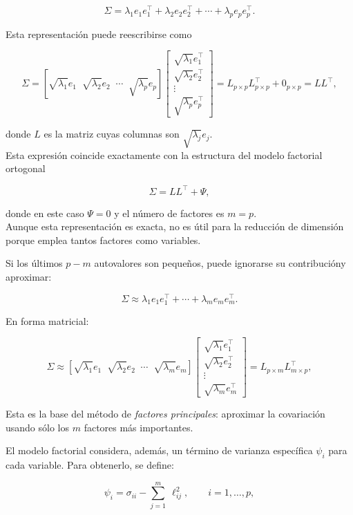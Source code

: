 \documentclass[
]{book}
\begin{document}
\[
\Sigma 
= \lambda_1 e_1 e_1^\top 
+ \lambda_2 e_2 e_2^\top 
+ \cdots 
+ \lambda_p e_p e_p^\top.
\]

Esta representación puede reescribirse como

\[
\Sigma 
= 
\left[
\sqrt{\lambda_1} e_1 \;\; 
\sqrt{\lambda_2} e_2 \;\; 
\cdots \;\; 
\sqrt{\lambda_p} e_p
\right]
\left[
\begin{array}{c}
\sqrt{\lambda_1} e_1^\top \\
\sqrt{\lambda_2} e_2^\top \\
\vdots \\
\sqrt{\lambda_p} e_p^\top
\end{array}
\right]
= L_{p\times p}L_{p\times p}^\top + 0_{p\times p} = LL^\top,
\]

donde \(L\) es la matriz cuyas columnas son \(\sqrt{\lambda_j} e_j\).\\
Esta expresión coincide exactamente con la estructura del modelo factorial ortogonal

\[
\Sigma = LL^{\top} + \Psi,
\]

donde en este caso \(\Psi = 0\) y el número de factores es \(m = p\).\\
Aunque esta representación es exacta, no es útil para la reducción de dimensión porque emplea tantos factores como variables.

Si los últimos \(p-m\) autovalores son pequeños, puede ignorarse su contribucióny aproximar:

\[
\Sigma \approx 
\lambda_1 e_1 e_1^{\top} + \cdots + \lambda_m e_m e_m^{\top}.
\]

En forma matricial:

\[
\Sigma \approx 
\left[
\sqrt{\lambda_1} e_1 \;\; 
\sqrt{\lambda_2} e_2 \;\; 
\cdots \;\;
\sqrt{\lambda_m} e_m
\right]
\left[
\begin{array}{c}
\sqrt{\lambda_1} e_1^{\top} \\
\sqrt{\lambda_2} e_2^{\top} \\
\vdots \\
\sqrt{\lambda_m} e_m^{\top}
\end{array}
\right]
= L_{p\times m}L_{m\times p}^\top,
\]

Esta es la base del método de \textit{factores principales}: aproximar la covariación usando sólo los \(m\) factores más importantes.

El modelo factorial considera, además, un término de varianza específica \(\psi_i\) para cada variable. Para obtenerlo, se define:

\[
\psi_i = \sigma_{ii} - \sum_{j=1}^m \ \ell_{ij}^2, 
\qquad i = 1,\dots,p,
\]
\end{document}
